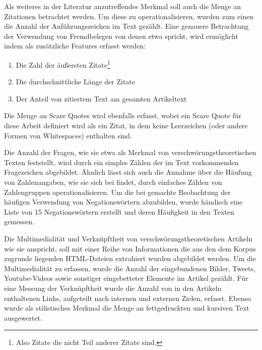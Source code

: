 Als weiteres in der Literatur anzutreffendes Merkmal soll auch die Menge an Zitationen betrachtet werden.
Um diese zu operationalisieren, wurden zum einen die Anzahl der Anführungszeichen im Text gezählt.
Eine genauere Betrachtung der Verwendung von Fremdbelegen von denen etwa \textcite[235]{schafer_2018} spricht, wird ermöglicht indem als zusätzliche Features erfasst werden:

\begin{enumerate}
    \item Die Zahl der äußersten Zitate\footnote{Also Zitate die nicht Teil anderer Zitate sind.}
    \item Die durchschnittliche Länge der Zitate
    \item Der Anteil von zitiertem Text am gesamten Artikeltext
\end{enumerate}

Die Menge an Scare Quotes wird ebenfalls erfasst, wobei ein Scare Quote für diese Arbeit definiert wird als ein Zitat, in dem keine Leerzeichen (oder andere Formen von Whitespaces) enthalten sind.

Die Anzahl der Fragen, wie sie etwa \textcite[205]{filatkina_2018} als Merkmal von verschwörungstheoretischen Texten feststellt, wird durch ein simples Zählen der im Text vorkommenden Fragezeichen abgebildet.
Ähnlich lässt sich auch die Annahme über die Häufung von Zahlenangaben, wie sie sich bei \textcite[234]{schafer_2018} findet, durch einfaches Zählen von Zahlengruppen operationalisieren.
Um die bei \textcite[149]{stumpf_2019} gemachte Beobachtung der häufigen Verwendung von Negationswörtern abzubilden, wurde händisch eine Liste von 15 Negationswörtern erstellt und deren Häufigkeit in den Texten gemessen.

Die Multimedialität und Verknüpftheit von verschwörungstheoretischen Artikeln wie sie \textcite[10]{soukup_2008} anspricht, soll mit einer Reihe von Informationen die aus den dem Korpus zugrunde liegenden HTML-Dateien extrahiert wurden abgebildet werden.
Um die Multimedialität zu erfassen, wurde die Anzahl der eingebundenen Bilder, Tweets, Youtube-Videos sowie sonstiger eingebetteter Elemente im Artikel gezählt.
Für eine Messung der Verknüpftheit wurde die Anzahl von in den Artikeln enthaltenen Links, aufgeteilt nach internen und externen Zielen, erfasst.
Ebenso wurde als stilistisches Merkmal die Menge an fettgedruckten und kursiven Text ausgewertet.

